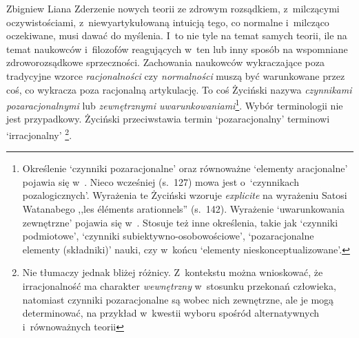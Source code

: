 \begin{artplenv}{Zbigniew Liana}
Zderzenie nowych teorii ze zdrowym rozsądkiem, z~milczącymi oczywistościami, z~niewyartykułowaną intuicją tego, co
normalne i~milcząco oczekiwane, musi dawać do myślenia. I~to nie tyle na temat samych teorii, ile na temat naukowców i~filozofów
reagujących w~ten lub inny sposób na wspomniane zdroworozsądkowe sprzeczności. Zachowania naukowców
wykraczające poza tradycyjne wzorce \textit{racjonalności} czy \textit{normalności} muszą być warunkowane przez coś, co
wykracza poza racjonalną artykulację. To coś Życiński nazywa \textit{czynnikami pozaracjonalnymi} lub \textit{zewnętrznymi
uwarunkowaniami}\footnote{Określenie `czynniki pozaracjonalne' oraz równoważne `elementy aracjonalne' pojawia
się
w~\parencite[s.~142]{zycinski_jezyk_1983}.
Nieco wcześniej
(s.~127)
mowa jest o~`czynnikach pozalogicznych'. Wyrażenia te Życiński
wzoruje \textit{explicite} na wyrażeniu Satosi Watanabego ,,les éléments arationnels''
(s.~142).
Wyrażenie `uwarunkowania zewnętrzne' pojawia się
w~\parencites[s.~130]{zycinski_structure_1988}[s.~230]{zycinski_struktura_2013}.
Stosuje też inne określenia, takie jak `czynniki
podmiotowe', `czynniki subiektywno-osobowościowe', `pozaracjonalne elementy\textit{ }(składniki)' nauki, czy w~końcu
`elementy nieskonceptualizowane'.}. Wybór terminologii nie jest przypadkowy. Życiński przeciwstawia termin
`pozaracjonalny' terminowi `irracjonalny' 
\parencites[zob.][s.~137]{zycinski_structure_1988}[s.~242]{zycinski_struktura_2013}\footnote{%
Nie tłumaczy jednak bliżej różnicy. Z~kontekstu można wnioskować, że irracjonalność ma charakter
\textit{wewnętrzny} w~stosunku przekonań człowieka, natomiast czynniki pozaracjonalne są wobec nich zewnętrzne, ale je mogą determinować,
na przykład w~kwestii wyboru spośród alternatywnych i~równoważnych teorii}.


\end{artplenv}
